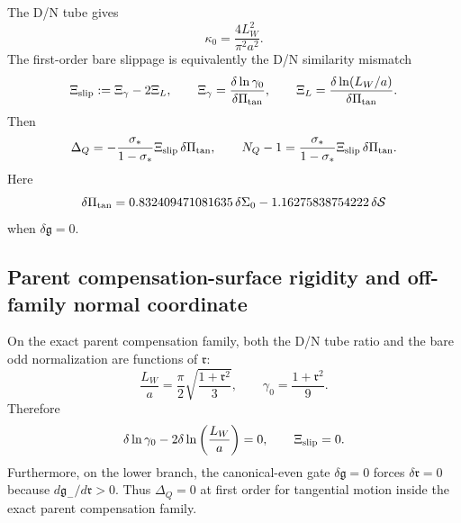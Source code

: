 The D/N tube gives
\begin{equation}
\label{eq:part04-kappa0-LW}
\kappa_0=\frac{4L_W^2}{\pi^2a^2}.
\end{equation}
The first-order bare slippage is equivalently the D/N similarity mismatch
\begin{equation}
\label{eq:part04-Xislip-def}
\Xi_{\rm slip}:=\Xi_\gamma-2\Xi_L,
\qquad
\Xi_\gamma=\frac{\delta\ln\gamma_0}{\delta\Pi_{\rm tan}},
\qquad
\Xi_L=\frac{\delta\ln(L_W/a)}{\delta\Pi_{\rm tan}}.
\end{equation}
Then
\begin{equation}
\label{eq:part04-DeltaQ-Xislip}
\Delta_Q
=-\frac{\sigma_*}{1-\sigma_*}\Xi_{\rm slip}\,\delta\Pi_{\rm tan},
\qquad
N_Q-1
=\frac{\sigma_*}{1-\sigma_*}\Xi_{\rm slip}\,\delta\Pi_{\rm tan}.
\end{equation}
Here
\begin{equation}
\label{eq:part04-deltaPi-tan}
\delta\Pi_{\rm tan}
=0.832409471081635\,\delta\Sigma_0
-1.16275838754222\,\delta\mathcal S
\end{equation}
when \(\delta\mathfrak g=0\).

\subsection{Parent compensation-surface rigidity and off-family normal coordinate}
\label{subsec:part04-off-family-normal-coordinate}

On the exact parent compensation family, both the D/N tube ratio and the bare odd normalization are functions of \(\mathfrak r\):
\begin{equation}
\label{eq:part04-parent-family-LW-gamma}
\frac{L_W}{a}=\frac{\pi}{2}\sqrt{\frac{1+\mathfrak r^2}{3}},
\qquad
\gamma_0=\frac{1+\mathfrak r^2}{9}.
\end{equation}
Therefore
\begin{equation}
\label{eq:part04-Xislip-zero-parent-family}
\delta\ln\gamma_0-2\delta\ln\left(\frac{L_W}{a}\right)=0,
\qquad
\Xi_{\rm slip}=0.
\end{equation}
Furthermore, on the lower branch, the canonical-even gate \(\delta\mathfrak g=0\) forces \(\delta\mathfrak r=0\) because \(d\mathfrak g_-/d\mathfrak r>0\).  Thus \(\Delta_Q=0\) at first order for tangential motion inside the exact parent compensation family.

